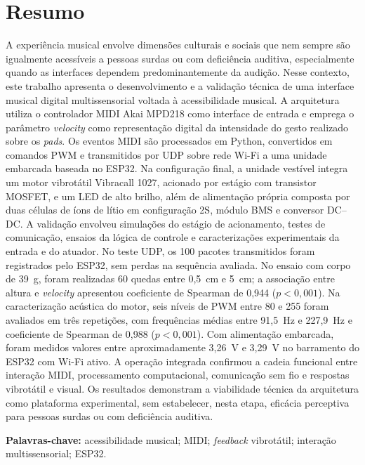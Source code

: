 \chapter*{Resumo}
A experiência musical envolve dimensões culturais e sociais que nem sempre são igualmente acessíveis a pessoas surdas ou com deficiência auditiva, especialmente quando as interfaces dependem predominantemente da audição. Nesse contexto, este trabalho apresenta o desenvolvimento e a validação técnica de uma interface musical digital multissensorial voltada à acessibilidade musical. A arquitetura utiliza o controlador MIDI Akai MPD218 como interface de entrada e emprega o parâmetro \textit{velocity} como representação digital da intensidade do gesto realizado sobre os \textit{pads}. Os eventos MIDI são processados em Python, convertidos em comandos PWM e transmitidos por UDP sobre rede Wi-Fi a uma unidade embarcada baseada no ESP32. Na configuração final, a unidade vestível integra um motor vibrotátil Vibracall 1027, acionado por estágio com transistor MOSFET, e um LED de alto brilho, além de alimentação própria composta por duas células de íons de lítio em configuração 2S, módulo BMS e conversor DC--DC. A validação envolveu simulações do estágio de acionamento, testes de comunicação, ensaios da lógica de controle e caracterizações experimentais da entrada e do atuador. No teste UDP, os 100 pacotes transmitidos foram registrados pelo ESP32, sem perdas na sequência avaliada. No ensaio com corpo de 39~g, foram realizadas 60 quedas entre 0,5~cm e 5~cm; a associação entre altura e \textit{velocity} apresentou coeficiente de Spearman de 0,944 ($p<0{,}001$). Na caracterização acústica do motor, seis níveis de PWM entre 80 e 255 foram avaliados em três repetições, com frequências médias entre 91,5~Hz e 227,9~Hz e coeficiente de Spearman de 0,988 ($p<0{,}001$). Com alimentação embarcada, foram medidos valores entre aproximadamente 3,26~V e 3,29~V no barramento do ESP32 com Wi-Fi ativo. A operação integrada confirmou a cadeia funcional entre interação MIDI, processamento computacional, comunicação sem fio e respostas vibrotátil e visual. Os resultados demonstram a viabilidade técnica da arquitetura como plataforma experimental, sem estabelecer, nesta etapa, eficácia perceptiva para pessoas surdas ou com deficiência auditiva.

\noindent\textbf{Palavras-chave:} acessibilidade musical; MIDI; \textit{feedback} vibrotátil; interação multissensorial; ESP32.

\clearpage
